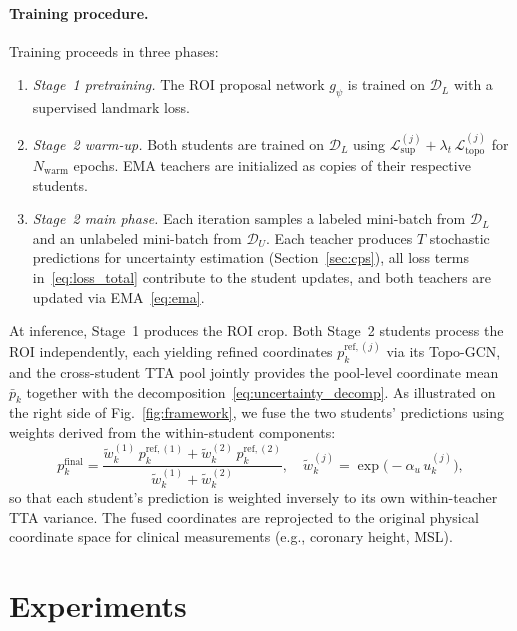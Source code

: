 \documentclass[conference]{IEEEtran}
\begin{document}
\paragraph{Training procedure.}
Training proceeds in three phases:
\begin{enumerate}
  \item \emph{Stage~1 pretraining.} The ROI proposal network $g_\psi$ is trained on $\mathcal{D}_L$ with a supervised landmark loss.
  \item \emph{Stage~2 warm-up.} Both students are trained on $\mathcal{D}_L$ using $\mathcal{L}_{\mathrm{sup}}^{(j)} + \lambda_t\,\mathcal{L}_{\mathrm{topo}}^{(j)}$ for $N_{\mathrm{warm}}$ epochs. EMA teachers are initialized as copies of their respective students.
  \item \emph{Stage~2 main phase.} Each iteration samples a labeled mini-batch from $\mathcal{D}_L$ and an unlabeled mini-batch from $\mathcal{D}_U$. Each teacher produces $T$ stochastic predictions for uncertainty estimation (Section~\ref{sec:cps}), all loss terms in~\eqref{eq:loss_total} contribute to the student updates, and both teachers are updated via EMA~\eqref{eq:ema}.
\end{enumerate}
At inference, Stage~1 produces the ROI crop. Both Stage~2 students process the ROI independently, each yielding refined coordinates $p_k^{\mathrm{ref},(j)}$ via its Topo-GCN, and the cross-student TTA pool jointly provides the pool-level coordinate mean $\bar{p}_k$ together with the decomposition~\eqref{eq:uncertainty_decomp}. As illustrated on the right side of Fig.~\ref{fig:framework}, we fuse the two students' predictions using weights derived from the within-student components:
\begin{equation}
  p_k^{\mathrm{final}} = \frac{\tilde{w}_k^{(1)}\,p_k^{\mathrm{ref},(1)} + \tilde{w}_k^{(2)}\,p_k^{\mathrm{ref},(2)}}{\tilde{w}_k^{(1)} + \tilde{w}_k^{(2)}},
  \quad \tilde{w}_k^{(j)} = \exp\!\bigl(-\alpha_u\,u_k^{(j)}\bigr),
  \label{eq:fusion}
\end{equation}
so that each student's prediction is weighted inversely to its own within-teacher TTA variance. The fused coordinates are reprojected to the original physical coordinate space for clinical measurements (e.g., coronary height, MSL).

\section{Experiments}
\label{sec:experiments}
\end{document}
